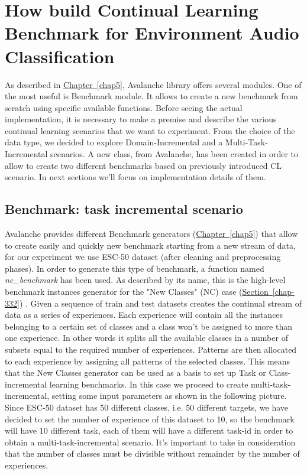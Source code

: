 \documentclass[english, LaM, oneside]{sapthesis}%
\begin{document}
\section{How build Continual Learning Benchmark for  Environment Audio Classification}
As described in \hyperref[chap5]{Chapter~\ref*{chap5}}, Avalanche library offers several modules. One of the most useful is Benchmark module. It allows to create a new benchmark from scratch using specific available functions.
Before seeing the actual implementation, it is necessary to make a premise and describe the various continual learning scenarios that we want to experiment. From the choice of the data type, we decided to explore Domain-Incremental and a Multi-Task-Incremental scenarios.
\newline \newline
A new class, from Avalanche, has been created in order to allow to create two different benchmarks based on previously introduced CL scenario. In next sections we'll focus on implementation details of them.
\subsection{Benchmark: task incremental scenario}
Avalanche provides different Benchmark generators (\hyperref[chap5]{Chapter~\ref*{chap5}}) that allow to create easily and quickly new benchmark starting from a new stream of data, for our experiment we use ESC-50 dataset (after cleaning and preprocessing phases).  In order to generate this type of benchmark, a function named \textit{nc\_benchmark} has been used. As described by its name, this is the high-level benchmark instances generator for the "New Classes" (NC) case (\hyperref[chap-332]{Section~\ref*{chap-332}}) . Given a sequence of train and test datasets creates the continual stream of data as a series of experiences. Each experience will contain all the instances belonging to a certain set of classes and a class won't be assigned to more than one experience. In other words it splits all the available classes in a number of subsets equal to the required number of experiences. Patterns are then allocated to each experience by assigning all patterns of the selected classes. This means that the New Classes generator can be used as a basis to set up Task or Class-incremental learning benchmarks. In this case we proceed to create multi-task-incremental, setting some input parameters as  shown in the following picture. 
\\
Since ESC-50 dataset has 50 different classes, i.e. 50 different targets, we have decided to set the number of experience of this dataset to 10, so the benchmark will have 10 different task, each of them will have a different task-id in order to obtain a multi-task-incremental scenario. It's important to take in consideration that the number of classes must be divisible without remainder by the number of experiences.
\end{document}
